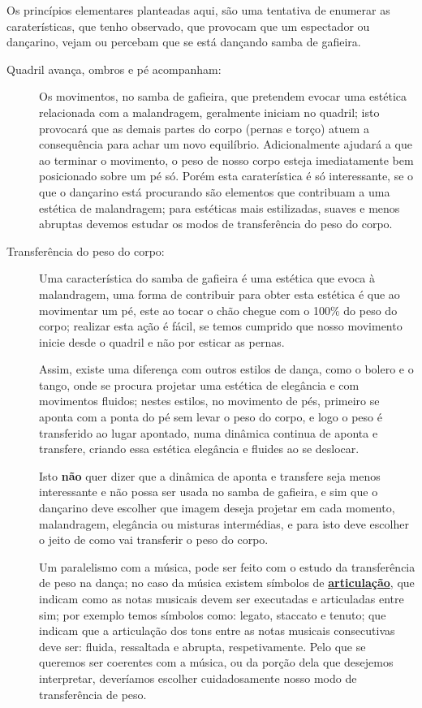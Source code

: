 Os princípios elementares planteadas aqui, são uma tentativa de enumerar as caraterísticas,
que tenho observado, que provocam que um espectador ou dançarino,
vejam ou percebam que se está dançando samba de gafieira.
\begin{description}
\item[Quadril avança, ombros e pé acompanham:]  Os movimentos, no samba de gafieira, 
que pretendem evocar uma estética relacionada com a malandragem,  geralmente iniciam no quadril;
isto provocará que as demais partes do corpo (pernas e torço) atuem a consequência para achar um novo equilíbrio.
Adicionalmente ajudará a que ao terminar o movimento, o peso de nosso corpo esteja imediatamente bem posicionado sobre um pé só.
Porém esta caraterística é só interessante, 
se o que o dançarino está procurando são elementos que contribuam a uma estética de malandragem;
para estéticas mais estilizadas, suaves e menos abruptas devemos estudar os modos de transferência do peso do corpo.

\item[Transferência do peso do corpo:] %
Uma característica do samba de gafieira é uma estética que evoca à malandragem, 
uma forma de contribuir para obter esta estética é que ao movimentar um pé, 
este ao tocar o chão chegue com o 100\% do peso do corpo; realizar esta ação é fácil, 
se temos cumprido que nosso movimento inicie desde o quadril e não por esticar as pernas.

Assim, existe uma diferença com outros estilos de dança, 
como o bolero e o tango, 
onde se procura projetar uma estética de elegância e com movimentos fluidos;
nestes estilos, no movimento de pés, primeiro se aponta com a ponta do pé sem levar o peso do corpo,
 e logo o peso é transferido ao lugar apontado, numa dinâmica continua de aponta e transfere,
criando essa estética elegância e fluides ao se deslocar.

Isto \textbf{não} quer dizer que a dinâmica de aponta e transfere seja menos interessante e não possa ser usada no samba de gafieira,
e sim que o dançarino deve escolher que imagem deseja projetar em cada momento,
malandragem, elegância ou misturas intermédias, e para isto deve escolher o jeito de como vai transferir o peso do corpo. 

Um paralelismo com a música, pode ser feito com o estudo da transferência de peso na dança;
no caso da música existem símbolos de \hyperref[sub:Articulation]{\textbf{articulação}}, 
que indicam como as notas musicais devem ser executadas e articuladas entre sim;
por exemplo temos símbolos como: legato, staccato e tenuto;
que indicam que a articulação dos tons entre as notas musicais consecutivas deve ser: fluida, ressaltada e  abrupta, respetivamente.
Pelo que se queremos ser coerentes com a música, 
ou da porção dela que desejemos interpretar,
deveríamos escolher cuidadosamente nosso modo de transferência de peso.



\end{description}
